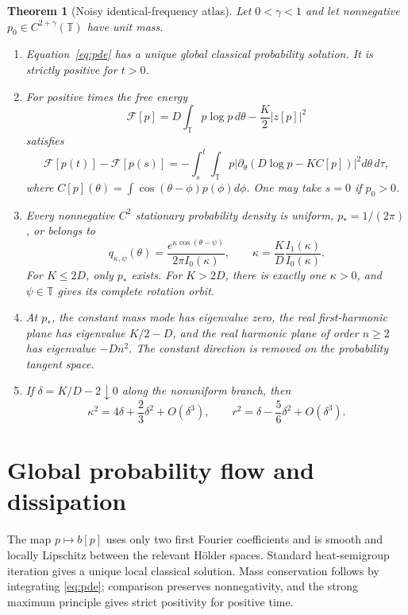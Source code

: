 \documentclass[10pt]{article}
\newtheorem{theorem}{Theorem}
\theoremstyle{remark}
\newcommand{\Torus}{\mathbb T}
\begin{document}
\begin{theorem}[Noisy identical-frequency atlas]\label{thm:main}
Let \(0<\gamma<1\) and let nonnegative \(p_0\in C^{2+\gamma}(\Torus)\)
have unit mass.
\begin{enumerate}[label=\textup{(\roman*)}]
\item Equation~\eqref{eq:pde} has a unique global classical probability
solution.  It is strictly positive for \(t>0\).
\item For positive times the free energy
\[
 \mathcal F[p]=D\int_{\Torus}p\log p\,d\theta-\frac K2|z[p]|^2
\]
satisfies
\begin{equation}
 \mathcal F[p(t)]-\mathcal F[p(s)]
 =-\int_s^t\!\int_{\Torus}p
 \left|\partial_\theta\left(D\log p-KC[p]\right)\right|^2d\theta\,d\tau,
 \label{eq:dissipation}
\end{equation}
where \(C[p](\theta)=\int\cos(\theta-\phi)p(\phi)d\phi\).  One may take
\(s=0\) if \(p_0>0\).
\item Every nonnegative \(C^2\) stationary probability density is uniform,
\(p_*=1/(2\pi)\), or belongs to
\begin{equation}
 q_{\kappa,\psi}(\theta)=
 \frac{e^{\kappa\cos(\theta-\psi)}}{2\pi I_0(\kappa)},\qquad
 \kappa=\frac KD\frac{I_1(\kappa)}{I_0(\kappa)}.             \label{eq:vm}
\end{equation}
For \(K\leq2D\), only \(p_*\) exists.  For \(K>2D\), there is exactly
one \(\kappa>0\), and \(\psi\in\Torus\) gives its complete rotation orbit.
\item At \(p_*\), the constant mass mode has eigenvalue zero, the real
first-harmonic plane has eigenvalue \(K/2-D\), and the real harmonic plane
of order \(n\geq2\) has eigenvalue \(-Dn^2\).  The constant direction is
removed on the probability tangent space.
\item If \(\delta=K/D-2\downarrow0\) along the nonuniform branch, then
\[
 \kappa^2=4\delta+\frac23\delta^2+O(\delta^3),\qquad
 r^2=\delta-\frac56\delta^2+O(\delta^3).
\]
\end{enumerate}
\end{theorem}

\section{Global probability flow and dissipation}

The map \(p\mapsto b[p]\) uses only two first Fourier coefficients and is
smooth and locally Lipschitz between the relevant H\"older spaces.  Standard
heat-semigroup iteration gives a unique local classical solution.  Mass
conservation follows by integrating \eqref{eq:pde}; comparison preserves
nonnegativity, and the strong maximum principle gives strict positivity for
positive time.
\end{document}
